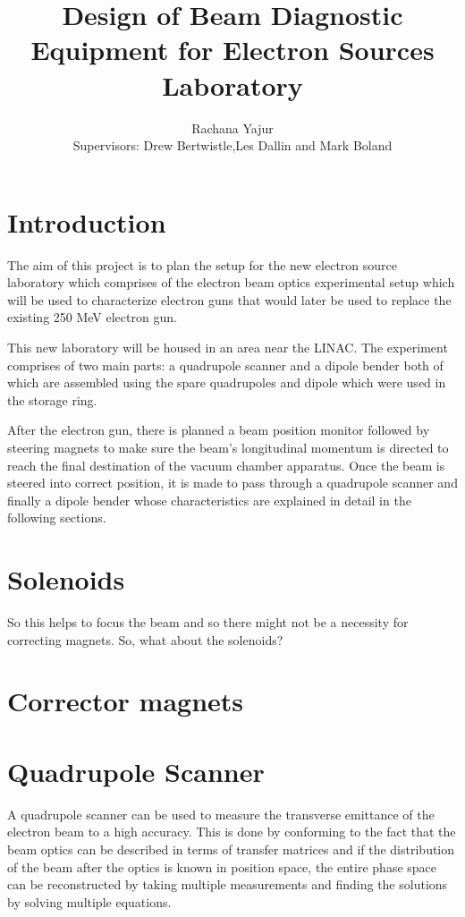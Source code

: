 \documentclass[11pt,a4paper]{article}
\author{Rachana Yajur\\Supervisors: Drew Bertwistle,Les Dallin and Mark Boland}
\title{Design of Beam Diagnostic Equipment for Electron Sources Laboratory}
\begin{document}
\maketitle

\tableofcontents 

	
    \section{Introduction}
    The aim of this project is to plan the setup for the new electron source laboratory which comprises of the electron beam optics experimental setup which will be used to characterize electron guns that would later be used to replace the existing 250 MeV electron gun.  
    
    This new laboratory will be housed in  an area near the LINAC. The experiment comprises of two main parts: a quadrupole scanner and a dipole bender both of which are assembled using the spare quadrupoles and dipole which were used in the storage ring.
    
    After the electron gun, there is planned a beam position monitor followed by steering magnets to make sure the beam's longitudinal momentum is directed to reach the final destination of the vacuum chamber apparatus. Once the beam is steered into correct position, it is made to pass through a quadrupole scanner and finally a dipole bender whose characteristics are explained in detail in the following sections. 
    
    
    \section{Solenoids}
    So this helps to focus the beam and so there might not be a necessity for correcting magnets. So, what about the solenoids? 
    
    \section{Corrector magnets}
    
    
    
    \section{Quadrupole Scanner}
    A quadrupole scanner can be used to measure the transverse emittance of the electron beam to a high accuracy. This is done by conforming to the fact that the beam optics can be described in terms of transfer matrices and if the distribution of the beam after the optics is known in position space, the entire phase space can be reconstructed by taking multiple measurements and finding the solutions by solving multiple equations. 
    
\end{document}
